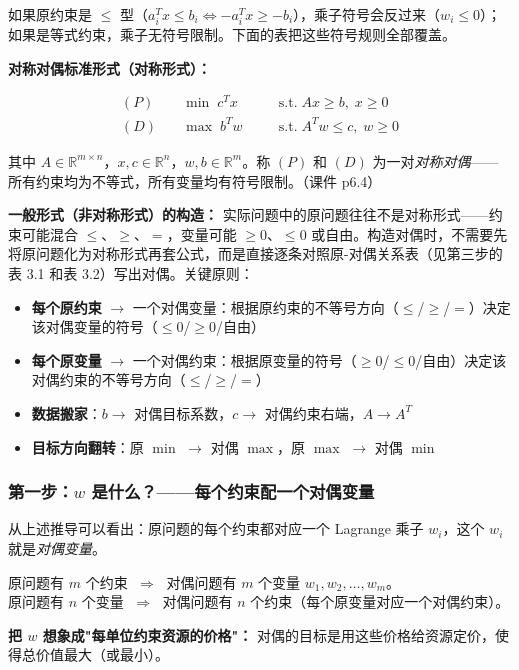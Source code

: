 如果原约束是 $\le$ 型（$a_i^T x \le b_i \iff -a_i^T x \ge -b_i$），乘子符号会反过来（$w_i \le 0$）；如果是等式约束，乘子无符号限制。下面的表把这些符号规则全部覆盖。

\medskip
\textbf{对称对偶标准形式（对称形式）：}

\[
\begin{aligned}
(P)\quad &\min\; c^T x &\quad& \text{s.t.}\; Ax \ge b,\; x \ge 0 \\[4pt]
(D)\quad &\max\; b^T w &\quad& \text{s.t.}\; A^T w \le c,\; w \ge 0
\end{aligned}
\]

其中 $A \in \mathbb{R}^{m \times n}$，$x, c \in \mathbb{R}^n$，$w, b \in \mathbb{R}^m$。称 $(P)$ 和 $(D)$ 为一对\emph{对称对偶}——所有约束均为不等式，所有变量均有符号限制。（课件 p6.4）

\medskip
\textbf{一般形式（非对称形式）的构造：} 实际问题中的原问题往往不是对称形式——约束可能混合 $\le$、$\ge$、$=$，变量可能 $\ge 0$、$\le 0$ 或自由。构造对偶时，不需要先将原问题化为对称形式再套公式，而是直接逐条对照原-对偶关系表（见第三步的表 3.1 和表 3.2）写出对偶。关键原则：

\begin{itemize}
  \item \textbf{每个原约束} $\to$ 一个对偶变量：根据原约束的不等号方向（$\le$/$\ge$/$=$）决定该对偶变量的符号（$\le 0$/$\ge 0$/自由）
  \item \textbf{每个原变量} $\to$ 一个对偶约束：根据原变量的符号（$\ge 0$/$\le 0$/自由）决定该对偶约束的不等号方向（$\le$/$\ge$/$=$）
  \item \textbf{数据搬家}：$b \to$ 对偶目标系数，$c \to$ 对偶约束右端，$A \to A^T$
  \item \textbf{目标方向翻转}：原 $\min$ $\to$ 对偶 $\max$，原 $\max$ $\to$ 对偶 $\min$
\end{itemize}

\subsubsection{第一步：$w$ 是什么？——每个约束配一个对偶变量}

从上述推导可以看出：原问题的每个约束都对应一个 Lagrange 乘子 $w_i$，这个 $w_i$ 就是\emph{对偶变量}。

原问题有 $m$ 个约束 $\;\Rightarrow\;$ 对偶问题有 $m$ 个变量 $w_1,w_2,\dots,w_m$。\\
原问题有 $n$ 个变量 $\;\Rightarrow\;$ 对偶问题有 $n$ 个约束（每个原变量对应一个对偶约束）。

\textbf{把 $w$ 想象成"每单位约束资源的价格"：} 对偶的目标是用这些价格给资源定价，使得总价值最大（或最小）。

